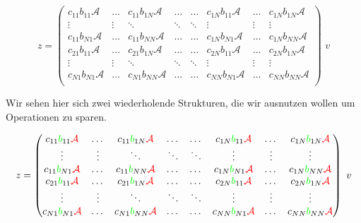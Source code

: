 \begin{equation} z=
\begin{pmatrix}
c_{11} b_{11} \mathcal{A} & \dots  & c_{11} b_{1N} \mathcal{A} & \dots & \dots & c_{1N}b_{11}\mathcal{A} & \dots & c_{1N}b_{1N}\mathcal{A}  \\

\vdots & \vdots & \ddots & \ddots  & \ddots & \vdots & \vdots & \vdots \\
c_{11} b_{N 1} \mathcal{A} & \dots  & c_{11} b_{N N} \mathcal{A} & \dots & \dots & c_{1 N}b_{N 1}\mathcal{A} & \dots & c_{1 N}b_{N N}\mathcal{A}  \\
c_{21} b_{11} \mathcal{A} & \dots  & c_{21} b_{1N} \mathcal{A} & \dots & \dots & c_{2N}b_{11}\mathcal{A} & \dots & c_{2 N}b_{1 N}\mathcal{A}  \\
\vdots & \vdots & \ddots & \ddots  & \ddots & \vdots & \vdots & \vdots \\
c_{N 1} b_{N 1} \mathcal{A} & \dots  & c_{N 1} b_{N N} \mathcal{A} & \dots & \dots & c_{N N}b_{N 1}\mathcal{A} & \dots & c_{N N}b_{N N}\mathcal{A}  \\
\end{pmatrix} \, \, v
\end{equation}

Wir sehen hier sich zwei wiederholende Strukturen, die wir ausnutzen wollen um Operationen zu sparen.

\begin{equation} \label{eq:matrix} z=
\begin{pmatrix}
c_{11} \textcolor{green}{b}_{11} \textcolor{red}{\mathcal{A}} & \dots  & c_{11} \textcolor{green}{b}_{1N} \textcolor{red}{\mathcal{A}} & \dots & \dots & c_{1N}\textcolor{green}{b}_{11}\textcolor{red}{\mathcal{A}} & \dots & c_{1N}\textcolor{green}{b}_{1N}\textcolor{red}{\mathcal{A}}  \\

\vdots & \vdots & \ddots & \ddots  & \ddots & \vdots & \vdots & \vdots \\
c_{11} \textcolor{green}{b}_{N 1} \textcolor{red}{\mathcal{A}} & \dots  & c_{11} \textcolor{green}{b}_{N N} \textcolor{red}{\mathcal{A}} & \dots & \dots & c_{1 N}\textcolor{green}{b}_{N 1}\textcolor{red}{\mathcal{A}} & \dots & c_{1 N}\textcolor{green}{b}_{N N}\textcolor{red}{\mathcal{A}}  \\
c_{21} \textcolor{green}{b}_{11} \textcolor{red}{\mathcal{A}} & \dots  & c_{21} \textcolor{green}{b}_{1N} \textcolor{red}{\mathcal{A}} & \dots & \dots & c_{2N}\textcolor{green}{b}_{11}\textcolor{red}{\mathcal{A}} & \dots & c_{2 N}\textcolor{green}{b}_{1 N}\textcolor{red}{\mathcal{A}}  \\
\vdots & \vdots & \ddots & \ddots  & \ddots & \vdots & \vdots & \vdots \\
c_{N 1} \textcolor{green}{b}_{N 1} \textcolor{red}{\mathcal{A}} & \dots  & c_{N 1} \textcolor{green}{b}_{N N} \textcolor{red}{\mathcal{A}} & \dots & \dots & c_{N N}\textcolor{green}{b}_{N 1}\textcolor{red}{\mathcal{A}} & \dots & c_{N N}\textcolor{green}{b}_{N N}\textcolor{red}{\mathcal{A}}  \\
\end{pmatrix} \, \, v
\end{equation}

